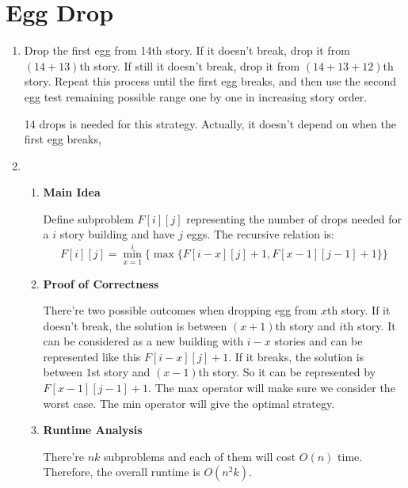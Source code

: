 \documentclass[11pt]{article}
\newenvironment{qparts}{\begin{enumerate}[{(}a{)}]}{\end{enumerate}}
\begin{document}
\newpage
\section{Egg Drop}
\begin{qparts}
	\item 
	
	Drop the first egg from 14th story. If it doesn't break, drop it from $(14 + 13)$th story. If still it doesn't break, drop it from $(14 + 13 + 12)$th story. Repeat this process until the first egg breaks, and then use the second egg test remaining possible range one by one in increasing story order.
	
	14 drops is needed for this strategy. Actually, it doesn't depend on when the first egg breaks, 
	
	\item
	
	\renewcommand{\theenumii}{\roman{enumii}}
	\begin{enumerate}
		\item \textbf{Main Idea}
		
		Define subproblem $F[i][j]$ representing the number of drops needed for a $i$ story building and have $j$ eggs.
		The recursive relation is:		
		\[
			F[i][j] = \min_{x = 1}^{i}\{ \max\{ F[i - x][j] + 1 , F[x-1][j-1] + 1 \} \}
		\]
		
		\item \textbf{Proof of Correctness}
		
		There're two possible outcomes when dropping egg from $x$th story. If it doesn't break, the solution is between $(x+1)$th story and $i$th story. It can be considered as a new building with $i-x$ stories and can be represented like this $F[i - x][j] + 1$. If it breaks, the solution is between $1$st story and $(x-1)$th story. So it can be represented by $F[x-1][j-1] + 1$. The max operator will make sure we consider the worst case. The min operator will give the optimal strategy.
		
		\item \textbf{Runtime Analysis}
		
		There're $nk$ subproblems and each of them will cost $O(n)$ time. Therefore, the overall runtime is $O(n^2k)$.
	
	\end{enumerate}

\end{qparts}


\newpage
\end{document}
